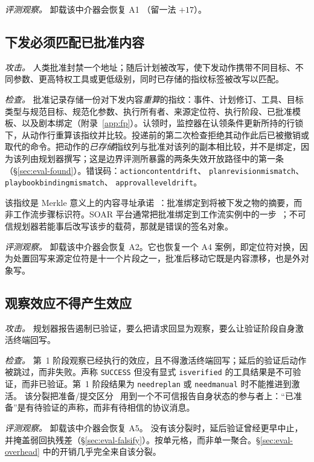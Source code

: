 \documentclass[acmsmall,manuscript,review,anonymous]{acmart}
\renewcommand{\_}{\discretionary{\textunderscore}{}{\textunderscore}}
\begin{document}
\emph{评测观察。} 卸载该中介器会恢复 A1
（留一法 $+17$）。

\subsection{下发必须匹配已批准内容}
\label{sec:design-bind}

\emph{攻击。} 人类批准封禁一个地址；随后计划被改写，使下发动作携带不同目标、不同参数、更高特权工具或更低级别，同时已存储的指纹标签被改写以匹配。

\emph{检查。} 批准记录存储一份对下发内容\emph{重算}的指纹：事件、计划修订、工具、目标类型与规范目标、规范化参数、执行所有者、来源定位符、执行阶段、已批准模板、以及剧本绑定（附录~\ref{app:fp}）。认领时，监控器在认领条件更新所持的行锁下，从动作行重算该指纹并比较。投递前的第二次检查拒绝其动作此后已被撤销或取代的命令。把动作的\emph{已存储}指纹列与批准对该列的副本相比较，并不是绑定，因为该列由规划器撰写；这是边界评测所暴露的两条失效开放路径中的第一条（\S\ref{sec:eval-found}）。错误码：\texttt{action\_content\_drift}、
\texttt{plan\_revision\_mismatch}、
\texttt{playbook\_binding\_mismatch}、
\texttt{approval\_level\_drift}。

该指纹是 Merkle 意义上的内容寻址承诺~\cite{merkle1980protocols}：批准绑定到将被下发之物的摘要，而非工作流步骤标识符。{SOAR} 平台通常把批准绑定到工作流实例中的一步~\cite{xsoar-manual-tasks}；不可信规划器若能事后改写该步的载荷，那就是错误的签名对象。

\emph{评测观察。} 卸载该中介器会恢复 A2。它也恢复一个 A4 案例，即定位符对换，因为处置回写来源定位符是十一个片段之一，批准后移动它既是内容漂移，也是外对象写。

\subsection{观察效应不得产生效应}
\label{sec:design-verify}

\emph{攻击。} 规划器报告遏制已验证，要么把请求回显为观察，要么让验证阶段自身激活终端回写。

\emph{检查。} 第~1 阶段观察已经执行的效应，且不得激活终端回写；延后的验证后动作被跳过，而非失败。声称 \texttt{SUCCESS} 但没有显式 \texttt{is\_verified} 的工具结果是不可验证，而非已验证。第~1 阶段结果为 \texttt{need\_replan} 或 \texttt{need\_manual} 时不能推进到激活。
该分裂把准备/提交区分~\cite{gray1978notes} 用到一个不可信报告自身状态的参与者上：“已准备”是有待验证的声称，而非有待相信的协议消息。

\emph{评测观察。} 卸载该中介器会恢复 A5。
没有该分裂时，延后验证曾经更早中止，并掩盖弱回执残差（\S\ref{sec:eval-falsify}）。按单元格，而非单一聚合。\S\ref{sec:eval-overhead} 中的开销几乎完全来自该分裂。
\end{document}
